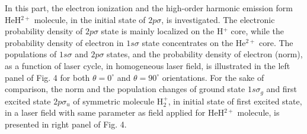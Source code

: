 \documentclass[%
reprint,
twocolumn,
 amsmath,amssymb,
 aps,
pra,
 showpacs
]{revtex4-1}
\begin{document}
\begin{figure*}[ht]
\begin{center}
\centering
{}
\caption{
\label{HHG} 
(Color online) The Morlet wavelet time profiles of dipole acceleration for (a) HeH$^{2+}$ molecule with initial state of $2p\sigma$ in homogeneous (b) and plasmonic-enhanced laser field, (c) HeH$^{2+}$ molecule with initial state of $1s\sigma$ in homogeneous (d) and plasmonic-enhanced laser field,  (e) H$_2^{+}$ molecule with initial state of $2p\sigma_u$ in homogeneous (f) and plasmonic-enhanced laser field. In all panels the relative orientation of the laser polarization and molecular axis is $\theta=0^{\circ}$, and the parameters of laser pulse are the same as in the previous figures. }
\end{center}
\end{figure*}
 \hspace*{0.4 mm}In this part, the electron ionization and the high-order harmonic emission form HeH$^{2+}$ molecule, in the initial state of $2p\sigma$, is investigated. The electronic probability density of $2p\sigma$ state is mainly localized on the H$^+$ core, while the  probability density of electron in $1s\sigma$ state concentrates on the He$^{2+}$ core.
The populations of $1s\sigma$ and $2p\sigma$ states, and the probability density of electron (norm), as a function of laser cycle, in homogeneous laser field, is illustrated in the left panel of Fig. 4 for both $\theta=0^{\circ}$ and $\theta=90^{\circ}$ orientations. For the sake of comparison, the norm and the population changes of ground state $1s\sigma_g$ and first excited state $2p\sigma_u$ of symmetric molecule H$_2^{+}$, in initial state of first excited state, in a laser field with same parameter as field applied for HeH$^{2+}$ molecule, is presented in right panel of Fig. 4.  
\end{document}
